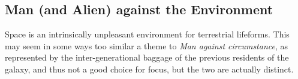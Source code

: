 \subsection{Man (and Alien) against the Environment}

Space is an intrinsically unpleasant environment for terrestrial
lifeforms. This may seem in some ways too similar a theme to {\em Man
against circumstance}, as represented by the inter-generational
baggage of the previous residents of the galaxy, and thus not a good
choice for focus, but the two are actually distinct.

